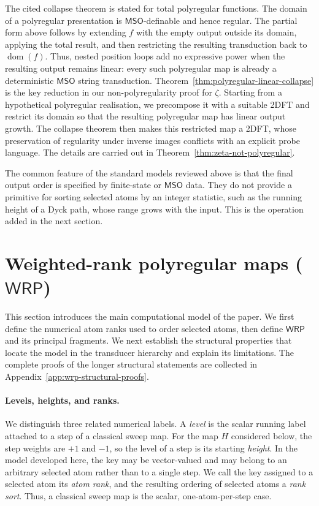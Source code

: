 \documentclass[11pt]{article}
\theoremstyle{definition}
\newcommand{\WRP}{\mathsf{WRP}}
\newcommand{\MSO}{\mathsf{MSO}}
\begin{document}
The cited collapse theorem is stated for total polyregular functions.  The
domain of a polyregular presentation is $\MSO$-definable and hence regular.
The partial form above follows by extending $f$ with the empty output outside
its domain, applying the total result, and then restricting the resulting
transduction back to $\operatorname{dom}(f)$.
Thus, nested position loops add no expressive power when the resulting output
remains linear: every such polyregular map is already a deterministic $\MSO$
string transduction.
Theorem~\ref{thm:polyregular-linear-collapse} is the key reduction in our
non-polyregularity proof for $\zeta$.  Starting from a hypothetical
polyregular realisation, we precompose it with a suitable 2DFT and restrict
its domain so that the resulting polyregular map has linear output growth.
The collapse theorem then makes this restricted map a 2DFT, whose preservation
of regularity under inverse images conflicts with an explicit probe language.
The details are carried out in Theorem~\ref{thm:zeta-not-polyregular}.

The common feature of the standard models reviewed above is that the final output order
is specified by finite-state or $\MSO$ data.  They do not provide a primitive
for sorting selected atoms by an integer statistic, such as the running height
of a Dyck path, whose range grows with the input.  This is the operation added
in the next section.

\section[Weighted-rank polyregular maps]{Weighted-rank polyregular maps ($\WRP$)}
\label{sec:wrp}

This section introduces the main computational model of the paper.  We first
define the numerical atom ranks used to order selected atoms, then define $\WRP$
and its principal fragments.  We next establish the structural properties that
locate the model in the transducer hierarchy and explain its limitations.
The complete proofs of the longer structural statements are collected in
Appendix~\ref{app:wrp-structural-proofs}.

\paragraph{Levels, heights, and ranks.}

We distinguish three related numerical labels.  A \emph{level} is the scalar
running label attached to a step of a classical sweep map.  For the map $H$
considered below, the step weights are $+1$ and $-1$, so the level of a
step is its starting \emph{height}.  In the model developed here, the key may
be vector-valued and may belong to an arbitrary selected atom rather than to a
single step.  We call the key assigned to a selected atom its \emph{atom rank},
and the resulting ordering of selected atoms a \emph{rank sort}.  Thus, a
classical sweep map is the scalar, one-atom-per-step case.
\end{document}
